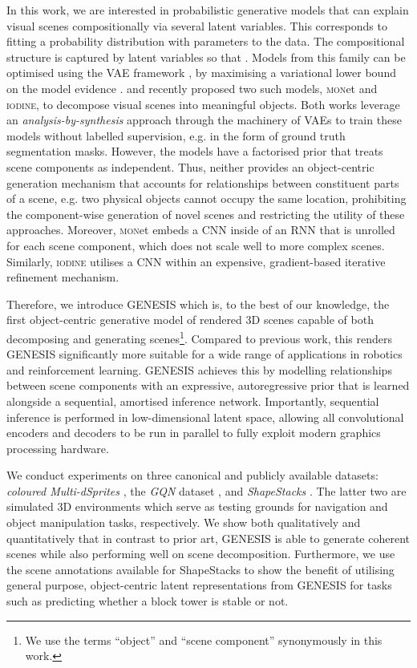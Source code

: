 \documentclass{article}
\begin{document}
In this work, we are interested in probabilistic generative models that can explain visual scenes compositionally via several latent variables.
This corresponds to fitting a probability distribution  with parameters  to the data.
The compositional structure is captured by  latent variables so that .
Models from this family can be optimised using the \gls{VAE} framework \citep{kingma2013auto,rezende2014stochastic}, by maximising a variational lower bound on the model evidence \citep{jordan1999introduction}.
\citet{burgess2019monet} and \citet{greff2019multi} recently proposed two such models, \textsc{mon}et and \textsc{iodine}, to decompose visual scenes into meaningful objects.
Both works leverage an \emph{analysis-by-synthesis} approach through the machinery of \glspl{VAE} \citep{kingma2013auto,rezende2014stochastic} to train these models without labelled supervision, e.g. in the form of ground truth segmentation masks.
However, the models have a factorised prior that treats scene components as independent.
Thus, neither provides an object-centric generation mechanism that accounts for relationships between constituent parts of a scene, e.g. two physical objects cannot occupy the same location, prohibiting the component-wise generation of novel scenes and restricting the utility of these approaches.
Moreover, \textsc{mon}et embeds a \gls{CNN} inside of an \gls{RNN} that is unrolled for each scene component, which does not scale well to more complex scenes.
Similarly, \textsc{iodine} utilises a \gls{CNN} within an expensive, gradient-based iterative refinement mechanism.

Therefore, we introduce \gls{GENESIS} which is, to the best of our knowledge, the first object-centric generative model of rendered 3D scenes capable of both decomposing and generating scenes\footnote{We use the terms ``object'' and ``scene component'' synonymously in this work.}.
Compared to previous work, this renders \gls{GENESIS} significantly more suitable for a wide range of applications in robotics and reinforcement learning. \gls{GENESIS} achieves this by modelling relationships between scene components with an expressive, autoregressive prior that is learned alongside a sequential, amortised inference network.
Importantly, sequential inference is performed in low-dimensional latent space, allowing all convolutional encoders and decoders to be run in parallel to fully exploit modern graphics processing hardware.

We conduct experiments on three canonical and publicly available datasets: \emph{coloured Multi-dSprites} \citep{burgess2019monet}, the \emph{GQN} dataset \citep{eslami2018neural}, and \emph{ShapeStacks} \citep{groth2018shapestacks}.
The latter two are simulated 3D environments which serve as testing grounds for navigation and object manipulation tasks, respectively.
We show both qualitatively and quantitatively that in contrast to prior art, \gls{GENESIS} is able to generate coherent scenes while also performing well on scene decomposition.
Furthermore, we use the scene annotations available for ShapeStacks to show the benefit of utilising general purpose, object-centric latent representations from \gls{GENESIS} for tasks such as predicting whether a block tower is stable or not.
\end{document}

